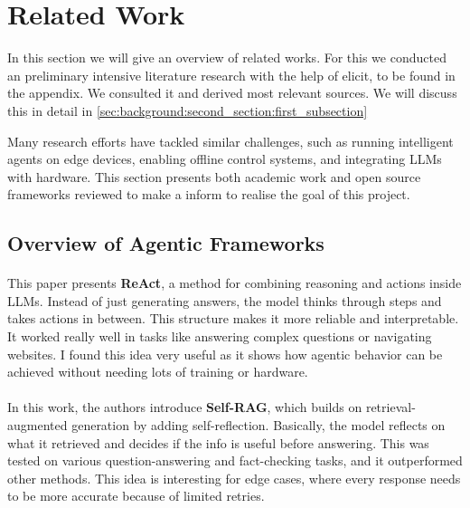 %
%

\section{Related Work}
\label{sec:background:second_section} 

In this section we will give an overview of related works. For this we conducted an preliminary intensive literature research with the help of elicit, to be found in the appendix. We consulted it and derived most relevant sources. We will discuss this in detail in \ref{sec:background:second_section:first_subsection} 

Many research efforts have tackled similar challenges, such as running intelligent agents on edge devices, enabling offline control systems, and integrating LLMs with hardware. This section presents both academic work and open source frameworks reviewed to make a inform to realise the goal of this project.

\subsection{Overview of Agentic Frameworks}
\label{subsec:background:first_section:first_subsection}

\paragraph{\cite{yao_react_2023}}
This paper presents \textbf{ReAct}, a method for combining reasoning and actions inside LLMs. Instead of just generating answers, the model thinks through steps and takes actions in between. This structure makes it more reliable and interpretable. It worked really well in tasks like answering complex questions or navigating websites. I found this idea very useful as it shows how agentic behavior can be achieved without needing lots of training or hardware.

\paragraph{\cite{asai_self-rag_2023}}
In this work, the authors introduce \textbf{Self-RAG}, which builds on retrieval-augmented generation by adding self-reflection. Basically, the model reflects on what it retrieved and decides if the info is useful before answering. This was tested on various question-answering and fact-checking tasks, and it outperformed other methods. This idea is interesting for edge cases, where every response needs to be more accurate because of limited retries.

